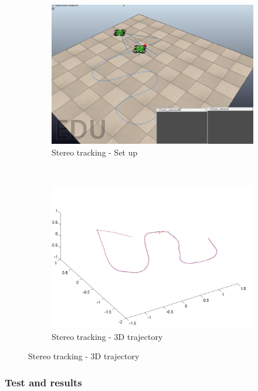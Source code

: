 \begin{figure}[h]
	\centering
	\begin{subfigure}[b]{0.4\linewidth}
	\centering
		\includegraphics[width=\linewidth]{../Images/c3/sim3_set_up}
		\caption{Stereo tracking - Set up}
		\label{fig:sim3_set_up}
	\end{subfigure}
	~
	\begin{subfigure}[b]{0.4\linewidth}
		\centering
		\includegraphics[width=\linewidth]{../Images/c3/sim3_traj_both_3d}
		\caption{Stereo tracking - 3D trajectory}
		\label{fig:sim3_traj_both_3d}
	\end{subfigure}
\end{figure}

\subsubsection{Test and results}

